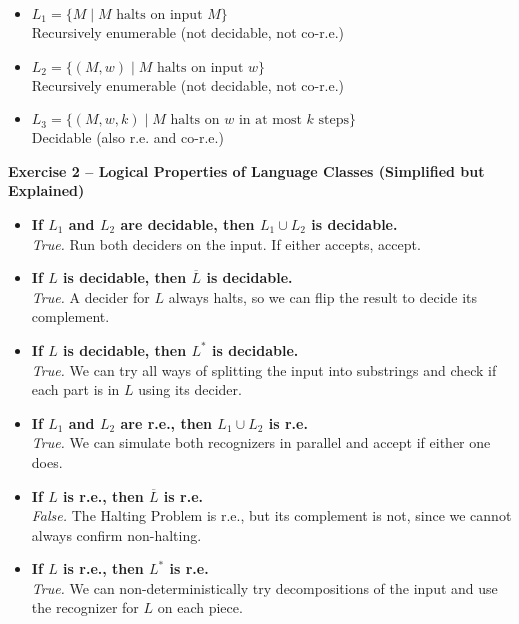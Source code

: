 \documentclass{article}
\theoremstyle{theorem}
\theoremstyle{definition}
\theoremstyle{remark}
\begin{document}
\begin{itemize}
    \item \textbf{$L_1 = \{ M \mid M \text{ halts on input } M \}$} \\
    Recursively enumerable (not decidable, not co-r.e.)

    \item \textbf{$L_2 = \{ (M, w) \mid M \text{ halts on input } w \}$} \\
    Recursively enumerable (not decidable, not co-r.e.)

    \item \textbf{$L_3 = \{ (M, w, k) \mid M \text{ halts on } w \text{ in at most } k \text{ steps} \}$} \\
    Decidable (also r.e. and co-r.e.)
\end{itemize}

\vspace{1em}
\textbf{Exercise 2 – Logical Properties of Language Classes (Simplified but Explained)}

\begin{itemize}
    \item \textbf{If $L_1$ and $L_2$ are decidable, then $L_1 \cup L_2$ is decidable.} \\
    \textit{True.} Run both deciders on the input. If either accepts, accept.

    \item \textbf{If $L$ is decidable, then $\overline{L}$ is decidable.} \\
    \textit{True.} A decider for $L$ always halts, so we can flip the result to decide its complement.

    \item \textbf{If $L$ is decidable, then $L^*$ is decidable.} \\
    \textit{True.} We can try all ways of splitting the input into substrings and check if each part is in $L$ using its decider.

    \item \textbf{If $L_1$ and $L_2$ are r.e., then $L_1 \cup L_2$ is r.e.} \\
    \textit{True.} We can simulate both recognizers in parallel and accept if either one does.

    \item \textbf{If $L$ is r.e., then $\overline{L}$ is r.e.} \\
    \textit{False.} The Halting Problem is r.e., but its complement is not, since we cannot always confirm non-halting.

    \item \textbf{If $L$ is r.e., then $L^*$ is r.e.} \\
    \textit{True.} We can non-deterministically try decompositions of the input and use the recognizer for $L$ on each piece.
\end{itemize}
\end{document}
